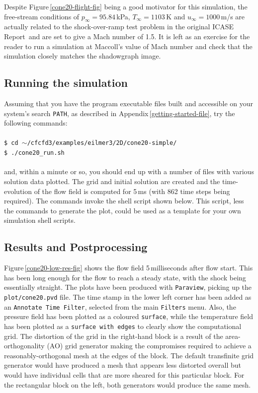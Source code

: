 \noindent\topbar

\bottombar

\medskip
Despite Figure\,\ref{cone20-flight-fig} being a good motivator for this simulation,
the free-stream conditions of $p_{\infty} = 95.84$\,kPa, $T_{\infty} = 1103$\,K
and $u_{\infty} = 1000$\,m/s are actually related to the shock-over-ramp test problem
in the original ICASE Report\,\cite{jacobs_91d} and are set to give a Mach number of 1.5.
It is left as an exercise for the reader to run a simulation at Maccoll's value of
Mach number and check that the simulation closely matches the shadowgraph image.


\subsection{Running the simulation}
%
Assuming that you have the program executable files built and
accessible on your system's search \texttt{PATH}, as described in Appendix\,\ref{getting-started-file},
try the following commands:\\
%
\topbar\\
\texttt{\$ cd $\sim$/cfcfd3/examples/eilmer3/2D/cone20-simple/}\\
\texttt{\$ ./cone20\_run.sh}\\
\bottombar\\
%
and, within a minute or so, you should end up with a number of files
with various solution data plotted.
The grid and initial solution are created and the time-evolution of the
flow field is computed for 5\,ms (with 862 time steps being required).
The commands invoke the shell script shown below.
This script, less the commands to generate the plot, could be used as
a template for your own simulation shell scripts.

\noindent \topbar

\bottombar

\subsection{Results and Postprocessing}
%
Figure\,\ref{cone20-low-res-fig} shows the flow field 5\,milliseconds after flow start.
This has been long enough for the flow to reach a steady state, with the shock being essentially straight.
The plots have been produced with \verb!Paraview!, picking up the \verb!plot/cone20.pvd! file.
The time stamp in the lower left corner has been added as an \verb!Annotate Time Filter!, 
selected from the main \verb!Filters! menu.
Also, the pressure field has been plotted as a coloured \verb!surface!, 
while the temperature field has been plotted as a \verb!surface with edges!
to clearly show the computational grid.
The distortion of the grid in the right-hand block is a result of the area-orthogonality (AO) grid generator
making the compromises required to achieve a reasonably-orthogonal mesh at the edges of the block.
The default transfinite grid generator would have produced a mesh that appears less distorted
overall but would have individual cells that are more sheared for this particular block.
For the rectangular block on the left, both generators would produce the same mesh.

